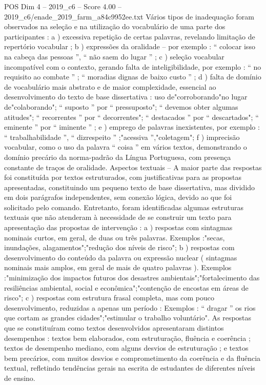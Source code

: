 \begin{textsample}{POS Dim 4 – 2019\_c6 – Score 4.00 – 2019\_c6/enade\_2019\_farm\_a84c9952ee.txt}
Vários tipos de inadequação foram observados na seleção e na utilização do vocabulário de uma parte dos participantes : a ) excessiva repetição de certas palavras, revelando limitação de repertório vocabular ; b ) expressões da oralidade – por exemplo : “ colocar isso na cabeça das pessoas ”, “ não saem do lugar ” ; c ) seleção vocabular incompatível com o contexto, gerando falta de inteligibilidade, por exemplo : “ no requisito ao combate ” ; “ moradias dignas de baixo custo ” ; d ) falta de domínio de vocabulário mais abstrato e de maior complexidade, essencial ao desenvolvimento do texto de base dissertativa : uso de"corroborando"no lugar de"colaborando"; “ suposto ” por “ pressuposto"; “ devemos obter algumas atitudes"; “ recorrentes ” por “ decorrentes"; “ destacados ” por “ descartados"; “ eminente ” por “ iminente ” ; e ) emprego de palavras inexistentes, por exemplo : “ trabalhabilidade ”, “ dizrespeito ” ;"acessiva ”,"coletagem"; f ) imprecisão vocabular, como o uso da palavra “ coisa ” em vários textos, demonstrando o domínio precário da norma-padrão da Língua Portuguesa, com presença constante de traços de oralidade.
Aspectos textuais – A maior parte das respostas foi constituída por textos estruturados, com justificativas para as propostas apresentadas, constituindo um pequeno texto de base dissertativa, mas dividido em dois parágrafos independentes, sem conexão lógica, devido ao que foi solicitado pelo comando.
Entretanto, foram identificadas algumas estruturas textuais que não atenderam à necessidade de se construir um texto para apresentação das propostas de intervenção : a ) respostas com sintagmas nominais curtos, em geral, de duas ou três palavras.
Exemplos :"secas, inundações, alagamentos";"redução dos níveis de risco"; b ) respostas com desenvolvimento do conteúdo da palavra ou expressão nuclear ( sintagmas nominais mais amplos, em geral de mais de quatro palavras ).
Exemplos :"minimização dos impactos futuros dos desastres ambientais";"fortalecimento das resiliências ambiental, social e econômica";"contenção de encostas em áreas de risco"; c ) respostas com estrutura frasal completa, mas com pouco desenvolvimento, reduzidas a apenas um período : Exemplos : “ dragar ” os rios que cortam as grandes cidades";"estimular o trabalho voluntário".
As respostas que se constituíram como textos desenvolvidos apresentaram distintos desempenhos : textos bem elaborados, com estruturação, fluência e coerência ; textos de desempenho mediano, com alguns desvios de estruturação ; e textos bem precários, com muitos desvios e comprometimento da coerência e da fluência textual, refletindo tendências gerais na escrita de estudantes de diferentes níveis de ensino.

\end{textsample}
